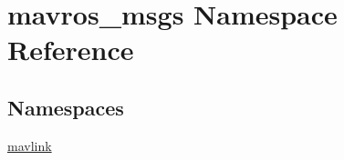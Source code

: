 \hypertarget{namespacemavros__msgs}{}\section{mavros\+\_\+msgs Namespace Reference}
\label{namespacemavros__msgs}
\subsection*{Namespaces}
\begin{DoxyCompactItemize}
\item 
 \mbox{\hyperlink{namespacemavros__msgs_1_1mavlink}{mavlink}}
\end{DoxyCompactItemize}
